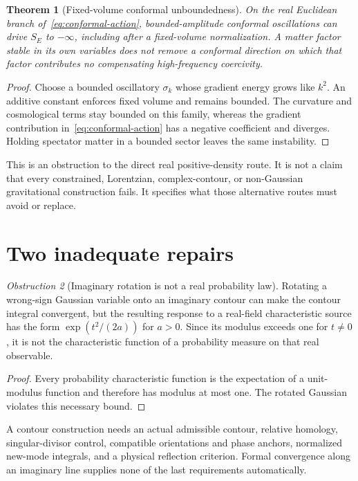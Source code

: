 \documentclass[11pt,a4paper,oneside]{book}
\theoremstyle{plain}
\newtheorem{theorem}{Theorem}[chapter]
\theoremstyle{definition}
\theoremstyle{remark}
\newtheorem{obstruction}[theorem]{Obstruction}
\newcommand{\src}[2]{\cite{#1}}
\begin{document}
\begin{theorem}[Fixed-volume conformal unboundedness]
\label{thm:conformal}
On the real Euclidean branch of~\eqref{eq:conformal-action}, bounded-amplitude conformal oscillations can drive $S_E$ to $-\infty$, including after a fixed-volume normalization. A matter factor stable in its own variables does not remove a conformal direction on which that factor contributes no compensating high-frequency coercivity.
\end{theorem}
\begin{proof}
Choose a bounded oscillatory $\sigma_k$ whose gradient energy grows like $k^2$. An additive constant enforces fixed volume and remains bounded. The curvature and cosmological terms stay bounded on this family, whereas the gradient contribution in~\eqref{eq:conformal-action} has a negative coefficient and diverges. Holding spectator matter in a bounded sector leaves the same instability.
\end{proof}
\src{R9}{thm:n9v93-conformal-unboundedness,cor:n9v93-no-direct-EH-coercivity}

This is an obstruction to the direct real positive-density route. It is not a claim that every constrained, Lorentzian, complex-contour, or non-Gaussian gravitational construction fails. It specifies what those alternative routes must avoid or replace.

\section{Two inadequate repairs}
\begin{obstruction}[Imaginary rotation is not a real probability law]
\label{obs:rotation}
Rotating a wrong-sign Gaussian variable onto an imaginary contour can make the contour integral convergent, but the resulting response to a real-field characteristic source has the form $\exp(t^2/(2a))$ for $a>0$. Since its modulus exceeds one for $t\ne0$, it is not the characteristic function of a probability measure on that real observable.
\end{obstruction}
\begin{proof}
Every probability characteristic function is the expectation of a unit-modulus function and therefore has modulus at most one. The rotated Gaussian violates this necessary bound.
\end{proof}
\cite{R9,R10}
A contour construction needs an actual admissible contour, relative homology, singular-divisor control, compatible orientations and phase anchors, normalized new-mode integrals, and a physical reflection criterion. Formal convergence along an imaginary line supplies none of the last requirements automatically.
\end{document}
